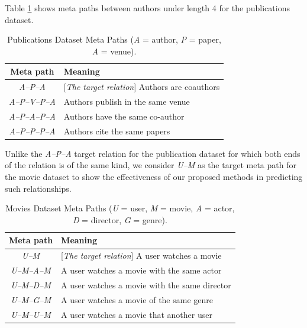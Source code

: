 Table \ref{table_publications} shows meta paths between authors under length 4 for the publications dataset.


\begin{table}[h]
\centering
\caption{Publications Dataset Meta Paths (\textit{A} = author, \textit{P} = paper, \textit{A} = venue).}
\label{table_publications}
\begin{tabular}{|c|l|} \hline
\textbf{Meta path} & \textbf{Meaning} \\ \hline

\textit{A--P--A} & [\textit{The target relation}] Authors are coauthors \\ \hline
\textit{A--P--V--P--A} & Authors publish in the same venue \\ \hline
\textit{A--P--A--P--A} & Authors have the same co-author \\ \hline
\textit{A--P--P--P--A} & Authors cite the same papers \\ \hline

\end{tabular}
\end{table}

Unlike the \textit{A--P--A} target relation for the publication dataset for which both ends of the relation is of the same kind, we consider \textit{U--M} as the target meta path for the movie dataset to show the effectiveness of our proposed methods in predicting such relationships.

\begin{table}[h]
\centering
\caption{Movies Dataset Meta Paths (\textit{U} = user, \textit{M} = movie, \textit{A} = actor, \textit{D} = director, \textit{G} = genre).}
\label{table_movies}
\begin{tabular}{|c|l|} \hline
\textbf{Meta path} & \textbf{Meaning} \\ \hline
\textit{U--M} & [\textit{The target relation}] A user watches a movie \\ \hline

\textit{U--M--A--M} & A user watches a movie with the same actor \\ \hline
\textit{U--M--D--M} & A user watches a movie with the same director \\ \hline
\textit{U--M--G--M} & A user watches a movie of the same genre \\ \hline
\textit{U--M--U--M} & A user watches a movie that another user  \\ \hline

\end{tabular}
\end{table}


